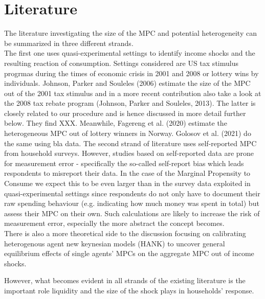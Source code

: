 \section{Literature} \label{sec:lit}
The literature investigating the size of the MPC and potential heterogeneity can be summarized in three different strands. \\
The first one uses quasi-experimental settings to identify income shocks and the resulting reaction of consumption. Settings considered are US tax stimulus progrmas during the times of economic crisis in 2001 and 2008 or lottery wins by individuals. Johnson, Parker and Souleles (2006) estimate the size of the MPC out of the 2001 tax stimulus and in a more recent contribution also take a look at the 2008 tax rebate program (Johnson, Parker and Souleles, 2013). The latter is closely related to our procedure and is hence discussed in more detail further below. They find XXX. Meanwhile, Fagereng et al. (2020) estimate the heterogeneous MPC out of lottery winners in Norway. Golosov et al. (2021) do the same using bla data. 
The second strand of literature uses self-reported MPC from household surveys. 
However, studies based on self-reported data are prone for measurement error - specifically the so-called self-report bias which leads respondents to misreport their data. In the case of the Marginal Propensity to Consume we expect this to be even larger than in the survey data exploited in quasi-experimental settings since respondents do not only have to document their raw spending behaviour (e.g. indicating how much money was spent in total) but assess their MPC on their own. Such calculations are likely to increase the risk of measurement error, especially the more abstract the concept becomes. \\
There is also a more theoretical side to the discussion focusing on calibrating heterogenous agent new keynesian models (HANK) to uncover general equilibrium effects of single agents' MPCs on the aggregate MPC out of income shocks.

However, what becomes evident in all strands of the existing literature is the important role liquidity and the size of the shock plays in households' response. 

